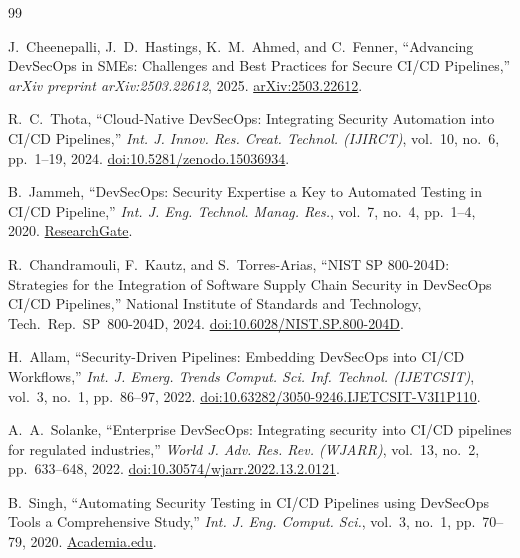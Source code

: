 \documentclass[letterpaper, 10pt, conference]{ieeeconf}
\begin{document}
\balance


\begin{thebibliography}{99}

J.~Cheenepalli, J.~D.~Hastings, K.~M.~Ahmed, and C.~Fenner,
``Advancing {DevSecOps} in {SMEs}: Challenges and Best Practices for
Secure {CI/CD} Pipelines,''
\textit{arXiv preprint arXiv:2503.22612}, 2025.
\href{https://arxiv.org/abs/2503.22612}{arXiv:2503.22612}.

R.~C.~Thota,
``Cloud-Native {DevSecOps}: Integrating Security Automation into
{CI/CD} Pipelines,''
\textit{Int. J. Innov. Res. Creat. Technol. (IJIRCT)},
vol.~10, no.~6, pp.~1--19, 2024.
\href{https://doi.org/10.5281/zenodo.15036934}{doi:10.5281/zenodo.15036934}.

B.~Jammeh,
``{DevSecOps}: Security Expertise a Key to Automated Testing in
{CI/CD} Pipeline,''
\textit{Int. J. Eng. Technol. Manag. Res.},
vol.~7, no.~4, pp.~1--4, 2020.
\href{https://www.researchgate.net/publication/347441415}{ResearchGate}.

R.~Chandramouli, F.~Kautz, and S.~Torres-Arias,
``{NIST} {SP} 800-204{D}: Strategies for the Integration of
Software Supply Chain Security in {DevSecOps} {CI/CD} Pipelines,''
National Institute of Standards and Technology,
Tech.\ Rep.\ SP~800-204D, 2024.
\href{https://doi.org/10.6028/NIST.SP.800-204D}{doi:10.6028/NIST.SP.800-204D}.

H.~Allam,
``Security-Driven Pipelines: Embedding {DevSecOps} into {CI/CD}
Workflows,''
\textit{Int. J. Emerg. Trends Comput. Sci. Inf. Technol. (IJETCSIT)},
vol.~3, no.~1, pp.~86--97, 2022.
\href{https://doi.org/10.63282/3050-9246.IJETCSIT-V3I1P110}{doi:10.63282/3050-9246.IJETCSIT-V3I1P110}.

A.~A.~Solanke,
``Enterprise {DevSecOps}: Integrating security into {CI/CD} pipelines
for regulated industries,''
\textit{World J. Adv. Res. Rev. (WJARR)},
vol.~13, no.~2, pp.~633--648, 2022.
\href{https://doi.org/10.30574/wjarr.2022.13.2.0121}{doi:10.30574/wjarr.2022.13.2.0121}.

B.~Singh,
``Automating Security Testing in {CI/CD} Pipelines using {DevSecOps}
Tools a Comprehensive Study,''
\textit{Int. J. Eng. Comput. Sci.},
vol.~3, no.~1, pp.~70--79, 2020.
\href{https://www.academia.edu/download/122922388/Title_9_dec_2020.pdf}{Academia.edu}.


\end{thebibliography}
\end{document}
